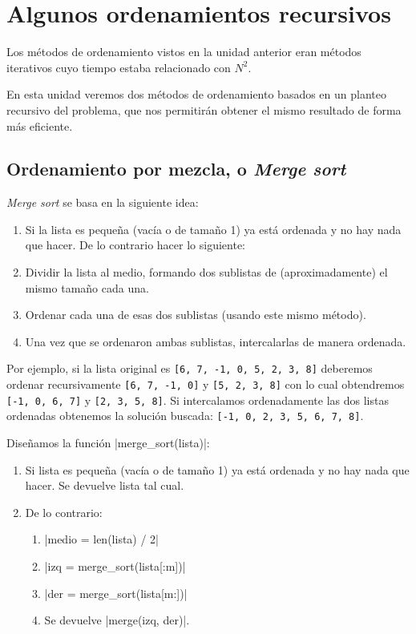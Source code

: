 \chapter{Algunos ordenamientos recursivos}

Los métodos de ordenamiento vistos en la unidad anterior eran métodos
iterativos cuyo tiempo estaba relacionado con $N^2$.

En esta unidad veremos dos métodos de ordenamiento basados
en un planteo recursivo del problema, que nos permitirán obtener el
mismo resultado de forma más eficiente.

\section{Ordenamiento por mezcla, o \emph{Merge sort} }

\emph{Merge sort} se basa en la siguiente idea:

\begin{enumerate}
\item Si la lista es pequeña (vacía o de tamaño 1) ya está ordenada y
no hay nada que hacer. De lo contrario hacer lo siguiente:
\item Dividir la lista al medio, formando dos sublistas de (aproximadamente) el
mismo tamaño cada una.
\item Ordenar cada una de esas dos sublistas (usando
este mismo método).
\item Una vez que se ordenaron ambas sublistas, intercalarlas de manera ordenada.
\end{enumerate}

Por ejemplo, si la lista original es \lstinline+[6, 7, -1, 0, 5, 2, 3, 8]+
deberemos ordenar recursivamente \lstinline+[6, 7, -1, 0]+ y
\lstinline+[5, 2, 3, 8]+ con lo cual obtendremos \lstinline+[-1, 0, 6, 7]+ y
\lstinline+[2, 3, 5, 8]+.  Si intercalamos ordenadamente las dos listas
ordenadas obtenemos la solución buscada:
\lstinline+[-1, 0, 2, 3, 5, 6, 7, 8]+.

Diseñamos la función |merge_sort(lista)|:

\begin{enumerate}
\item Si lista es pequeña (vacía o de tamaño 1) ya está ordenada y
no hay nada que hacer. Se devuelve lista tal cual.
\item De lo contrario:
\begin{enumerate}
\item |medio = len(lista) / 2|
\item |izq = merge_sort(lista[:m])|
\item |der = merge_sort(lista[m:])|
\item Se devuelve |merge(izq, der)|.
\end{enumerate}
\end{enumerate}

